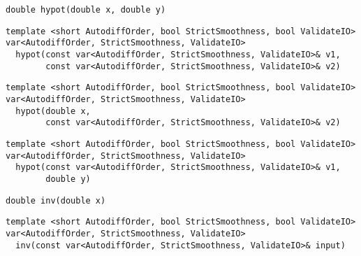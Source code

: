 \begin{tcolorbox}[colback=white,colframe=gray90, coltitle=black,boxrule=3pt,
fonttitle=\bfseries,title= Hypot]

\begin{verbatim}
double hypot(double x, double y)

\end{verbatim}

\begin{verbatim}
template <short AutodiffOrder, bool StrictSmoothness, bool ValidateIO>
var<AutodiffOrder, StrictSmoothness, ValidateIO>
  hypot(const var<AutodiffOrder, StrictSmoothness, ValidateIO>& v1,
        const var<AutodiffOrder, StrictSmoothness, ValidateIO>& v2)

\end{verbatim}

\begin{verbatim}
template <short AutodiffOrder, bool StrictSmoothness, bool ValidateIO>
var<AutodiffOrder, StrictSmoothness, ValidateIO>
  hypot(double x,
        const var<AutodiffOrder, StrictSmoothness, ValidateIO>& v2)

\end{verbatim}

\begin{verbatim}
template <short AutodiffOrder, bool StrictSmoothness, bool ValidateIO>
var<AutodiffOrder, StrictSmoothness, ValidateIO>
  hypot(const var<AutodiffOrder, StrictSmoothness, ValidateIO>& v1,
        double y)

\end{verbatim}

\end{tcolorbox}

\begin{tcolorbox}[colback=white,colframe=gray90, coltitle=black,boxrule=3pt,
fonttitle=\bfseries,title= Inv]

\begin{verbatim}
double inv(double x)

\end{verbatim}

\begin{verbatim}
template <short AutodiffOrder, bool StrictSmoothness, bool ValidateIO>
var<AutodiffOrder, StrictSmoothness, ValidateIO>
  inv(const var<AutodiffOrder, StrictSmoothness, ValidateIO>& input)

\end{verbatim}

\end{tcolorbox}

